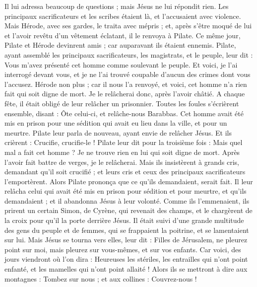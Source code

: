 \begin{multicols}{2}
Il lui adressa beaucoup de questions ; mais Jésus ne lui répondit rien.
Les principaux sacrificateurs et les scribes étaient là, et l’accusaient avec violence.
Mais Hérode, avec ses gardes, le traita avec mépris ; et, après s’être moqué de lui et l’avoir revêtu d'un vêtement éclatant, il le renvoya à Pilate.
Ce même jour, Pilate et Hérode devinrent amis ; car auparavant ils étaient ennemis.
Pilate, ayant assemblé les principaux sacrificateurs, les magistrats, et le peuple, leur dit :
Vous m'avez présenté cet homme comme soulevant le peuple. Et voici, je l’ai interrogé devant vous, et je ne l’ai trouvé coupable d’aucun des crimes dont vous l'accusez.
Hérode non plus ; car il nous l’a renvoyé, et voici, cet homme n’a rien fait qui soit digne de mort.
Je le relâcherai donc, après l’avoir châtié.
A chaque fête, il était obligé de leur relâcher un prisonnier.
Toutes les foules s'écrièrent ensemble, disant : Ôte celui-ci, et relâche-nous Barabbas.
Cet homme avait été mis en prison pour une sédition qui avait eu lieu dans la ville, et pour un meurtre.
Pilate leur parla de nouveau, ayant envie de relâcher Jésus.
Et ils crièrent : Crucifie, crucifie-le !
Pilate leur dit pour la troisième fois : Mais quel mal a fait cet homme ? Je ne trouve rien en lui qui soit digne de mort. Après l’avoir fait battre de verges, je le relâcherai.
Mais ils insistèrent à grands cris, demandant qu'il soit crucifié ; et leurs cris et ceux des principaux sacrificateurs l’emportèrent.
Alors Pilate prononça que ce qu'ils demandaient, serait fait.
Il leur relâcha celui qui avait été mis en prison pour sédition et pour meurtre, et qu’ils demandaient ; et il abandonna Jésus à leur volonté.
Comme ils l'emmenaient, ils prirent un certain Simon, de Cyrène, qui revenait des champs, et le chargèrent de la croix pour qu’il la porte derrière Jésus.
Il était suivi d'une grande multitude des gens du peuple et de femmes, qui se frappaient la poitrine, et se lamentaient sur lui.
Mais Jésus se tourna vers elles, leur dit : Filles de Jérusalem, ne pleurez point sur moi, mais pleurez sur vous-mêmes, et sur vos enfants.
Car voici, des jours viendront où l’on dira : Heureuses les stériles, les entrailles qui n’ont point enfanté, et les mamelles qui n'ont point allaité !
Alors ils se mettront à dire aux montagnes : Tombez sur nous ; et aux collines : Couvrez-nous !

\end{multicols}
